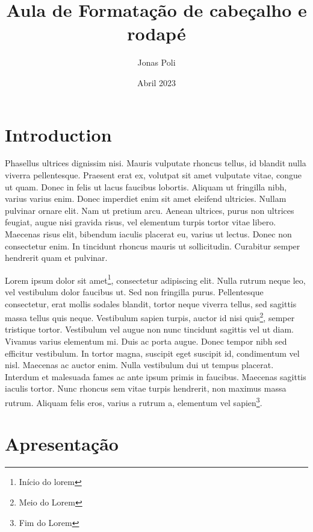 \documentclass{article}
\title{Aula de Formatação de cabeçalho e rodapé}
\author{Jonas Poli}
\date{Abril 2023}
\begin{document}
    \maketitle
    
    \section{Introduction}
    
    
    Phasellus ultrices dignissim nisi. Mauris vulputate rhoncus tellus, id blandit nulla viverra pellentesque. Praesent erat ex, volutpat sit amet vulputate vitae, congue ut quam. Donec in felis ut lacus faucibus lobortis. Aliquam ut fringilla nibh, varius varius enim. Donec imperdiet enim sit amet eleifend ultricies. Nullam pulvinar ornare elit. Nam ut pretium arcu. Aenean ultrices, purus non ultrices feugiat, augue nisi gravida risus, vel elementum turpis tortor vitae libero. Maecenas risus elit, bibendum iaculis placerat eu, varius ut lectus. Donec non consectetur enim. In tincidunt rhoncus mauris ut sollicitudin. Curabitur semper hendrerit quam et pulvinar.
    
    
    \lipsum[10-12]
    
    \lipsum[10-12]
    
    \lipsum[10-12]
    
    \lipsum[10-12]
    
    \lipsum[10-12]
    
    Lorem ipsum dolor sit amet\footnote{Início do lorem}, consectetur adipiscing elit. Nulla rutrum neque leo, vel vestibulum dolor faucibus ut. Sed non fringilla purus. Pellentesque consectetur, erat mollis sodales blandit, tortor neque viverra tellus, sed sagittis massa tellus quis neque. Vestibulum sapien turpis, auctor id nisi quis\footnote{Meio do Lorem}, semper tristique tortor. Vestibulum vel augue non nunc tincidunt sagittis vel ut diam. Vivamus varius elementum mi. Duis ac porta augue. Donec tempor nibh sed efficitur vestibulum. In tortor magna, suscipit eget suscipit id, condimentum vel nisl. Maecenas ac auctor enim. Nulla vestibulum dui ut tempus placerat. Interdum et malesuada fames ac ante ipsum primis in faucibus. Maecenas sagittis iaculis tortor. Nunc rhoncus sem vitae turpis hendrerit, non maximus massa rutrum. Aliquam felis eros, varius a rutrum a, elementum vel sapien\footnote{Fim do Lorem}.
    
    \section{Apresentação}
    \lipsum[10-12]
    
\end{document}
